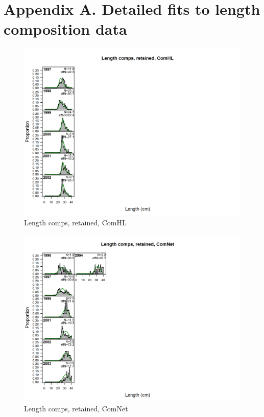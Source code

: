 \documentclass[12pt,]{article}
\begin{document}
\FloatBarrier

\FloatBarrier
\newpage

\section*{Appendix A. Detailed fits to length composition
data}\label{appendix-a.-detailed-fits-to-length-composition-data}

\renewcommand{\thepage}{A-\arabic{page}}
\renewcommand{\thefigure}{A\arabic{figure}}

\setcounter{page}{1}

\begin{figure}[htbp]
\centering
\includegraphics{./r4ss/plots_mod1/comp_lenfit_flt1mkt2.png}
\caption{Length comps, retained, ComHL
\label{fig:mod1_1_comp_lenfit_flt1mkt2}}
\end{figure}

\begin{figure}[htbp]
\centering
\includegraphics{./r4ss/plots_mod1/comp_lenfit_flt2mkt2.png}
\caption{Length comps, retained, ComNet
\label{fig:mod1_2_comp_lenfit_flt2mkt2}}
\end{figure}
\end{document}
